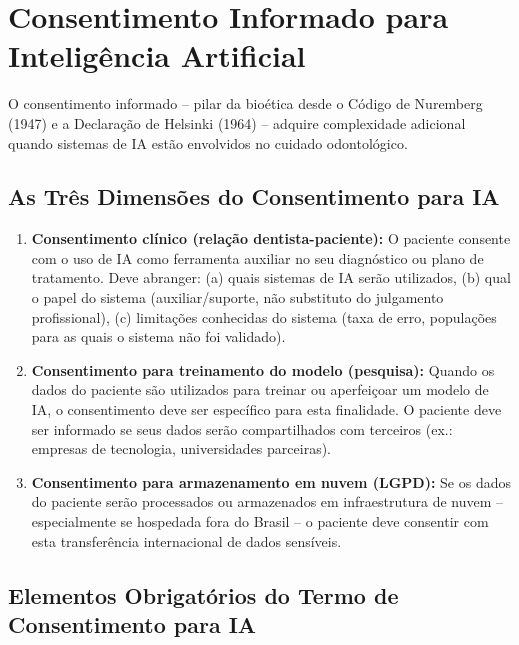 
\section{Consentimento Informado para Inteligência Artificial}
\label{sec:consentimento-ia}

\nivelquatro

O consentimento informado -- pilar da bioética desde o Código de Nuremberg
(1947) e a Declaração de Helsinki (1964) -- adquire complexidade adicional
quando sistemas de IA estão envolvidos no cuidado odontológico.

\subsection{As Três Dimensões do Consentimento para IA}

\begin{enumerate}
  \item \textbf{Consentimento clínico (relação dentista-paciente):} O paciente
    consente com o uso de IA como ferramenta auxiliar no seu diagnóstico ou
    plano de tratamento. Deve abranger: (a) quais sistemas de IA serão
    utilizados, (b) qual o papel do sistema (auxiliar/suporte, não substituto
    do julgamento profissional), (c) limitações conhecidas do sistema
    (taxa de erro, populações para as quais o sistema não foi validado).

  \item \textbf{Consentimento para treinamento do modelo (pesquisa):} Quando os
    dados do paciente são utilizados para treinar ou aperfeiçoar um modelo de
    IA, o consentimento deve ser específico para esta finalidade. O paciente
    deve ser informado se seus dados serão compartilhados com terceiros
    (ex.: empresas de tecnologia, universidades parceiras).

  \item \textbf{Consentimento para armazenamento em nuvem (LGPD):} Se os dados
    do paciente serão processados ou armazenados em infraestrutura de nuvem --
    especialmente se hospedada fora do Brasil -- o paciente deve consentir com
    esta transferência internacional de dados sensíveis.
\end{enumerate}

\subsection{Elementos Obrigatórios do Termo de Consentimento para IA}


